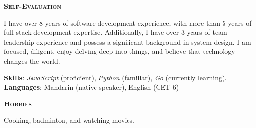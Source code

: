 \documentclass[a4paper]{article}
\newenvironment{changemargin}[2]{%
  \begin{list}{}{%
    \setlength{\topsep}{0pt}%
    \setlength{\leftmargin}{#1}%
    \setlength{\rightmargin}{#2}%
    \setlength{\listparindent}{\parindent}%
    \setlength{\itemindent}{\parindent}%
    \setlength{\parsep}{\parskip}%
  }%
  \item[]}{\end{list}
}
\newcommand{\lineover}{
	\begin{changemargin}{-0.05in}{-0.05in}
		\vspace*{-8pt}
		\hrulefill \\
		\vspace*{-2pt}
	\end{changemargin}
}
\newcommand{\header}[1]{
	\begin{changemargin}{-0.5in}{-0.5in}
		\scshape{\textbf{#1}}\\
	\end{changemargin}
}
\newenvironment{body} {
	\vspace*{-16pt}
	\begin{changemargin}{-0.5in}{-0.5in}
  }
	{\end{changemargin}
}
\begin{document}
\medskip


\header{Self-Evaluation}

\begin{body}
	\vspace{14pt}
	\begin{justify}
	I have over 8 years of software development experience, with more than 5 years of full-stack development expertise. Additionally, I have over 3 years of team leadership experience and possess a significant background in system design. I am focused, diligent, enjoy delving deep into things, and believe that technology changes the world.\\
	\end{justify}
	\vspace{-6pt}
	\textbf{Skills}: \emph{JavaScript} (proficient), \emph{Python} (familiar), \emph{Go} (currently learning). \\
	\textbf{Languages}: Mandarin {(native speaker)}, English {(CET-6)}\\
\end{body}

\medskip


\header{Hobbies}

\begin{body}
	\vspace{14pt}
	Cooking, badminton, and watching movies.\\
\end{body}
\end{document}
